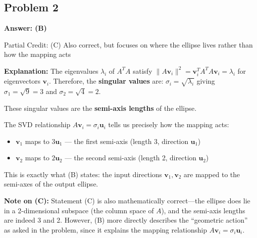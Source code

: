 \documentclass[12pt]{amsart}
\newcommand{\correct}[1]{{\color{correctgreen}\textbf{#1}}}
\newcommand{\partcred}[1]{{\color{partialblue}#1}}
\begin{document}
\subsection*{Problem 2}
\correct{Answer: (B)}

\partcred{Partial Credit: (C) Also correct, but focuses on where the ellipse lives rather than how the mapping acts}

\textbf{Explanation:} The eigenvalues $\lambda_i$ of $A^TA$ satisfy $\|A\mathbf{v}_i\|^2 = \mathbf{v}_i^T A^T A \mathbf{v}_i = \lambda_i$ for eigenvectors $\mathbf{v}_i$. Therefore, the \textbf{singular values} are:
$\sigma_i = \sqrt{\lambda_i}$
giving $\sigma_1 = \sqrt{9} = 3$ and $\sigma_2 = \sqrt{4} = 2$.

These singular values are the \textbf{semi-axis lengths} of the ellipse.

The SVD relationship $A\mathbf{v}_i = \sigma_i \mathbf{u}_i$ tells us precisely how the mapping acts:
\begin{itemize}
\item $\mathbf{v}_1$ maps to $3\mathbf{u}_1$ --- the first semi-axis (length 3, direction $\mathbf{u}_1$)
\item $\mathbf{v}_2$ maps to $2\mathbf{u}_2$ --- the second semi-axis (length 2, direction $\mathbf{u}_2$)
\end{itemize}

This is exactly what (B) states: the input directions $\mathbf{v}_1, \mathbf{v}_2$ are mapped to the semi-axes of the output ellipse.

\textbf{Note on (C):} Statement (C) is also mathematically correct---the ellipse does lie in a 2-dimensional subspace (the column space of $A$), and the semi-axis lengths are indeed 3 and 2. However, (B) more directly describes the ``geometric action'' as asked in the problem, since it explains the mapping relationship $A\mathbf{v}_i = \sigma_i\mathbf{u}_i$.
\end{document}
